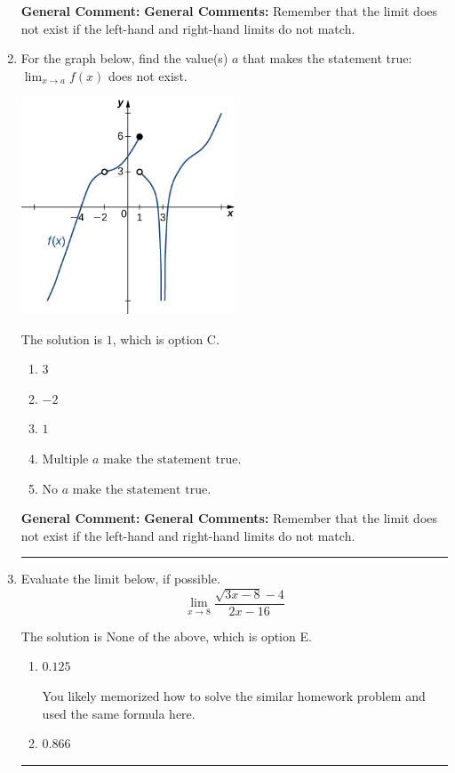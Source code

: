 \documentclass{extbook}[14pt]
\newcommand{\litem}[1]{\item #1

\rule{\textwidth}{0.4pt}}
\begin{document}
\begin{enumerate}
{\textbf{General Comment:} \textbf{General Comments:} Remember that the limit does not exist if the left-hand and right-hand limits do not match.
}
\litem{
For the graph below, find the value(s) $a$ that makes the statement true: $ \displaystyle \lim_{x \rightarrow a} f(x)$ does not exist.

\begin{center}
    \includegraphics[width=0.5\textwidth]{../Figures/evaluateLimitGraphicallyC.png}
\end{center}




The solution is \( 1 \), which is option C.\begin{enumerate}[label=\Alph*.]
\item \( 3 \)


\item \( -2 \)


\item \( 1 \)


\item \( \text{Multiple } a \text{ make the statement true}. \)


\item \( \text{No } a \text{ make the statement true}. \)


\end{enumerate}

\textbf{General Comment:} \textbf{General Comments:} Remember that the limit does not exist if the left-hand and right-hand limits do not match.
}
\litem{
Evaluate the limit below, if possible.
\[ \lim_{x \rightarrow 8} \frac{\sqrt{3x - 8} - 4}{2x - 16} \]

The solution is \( \text{None of the above} \), which is option E.\begin{enumerate}[label=\Alph*.]
\item \( 0.125 \)

You likely memorized how to solve the similar homework problem and used the same formula here.
\item \( 0.866 \)


\end{enumerate}}
\end{enumerate}
\end{document}
